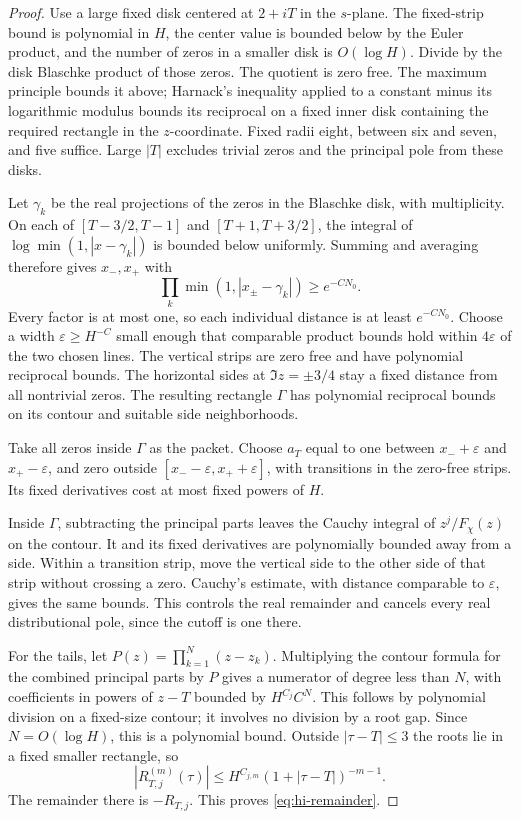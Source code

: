 \begin{proof}
Use a large fixed disk centered at $2+iT$ in the $s$-plane. The
fixed-strip bound is polynomial in $H$, the center value is bounded
below by the Euler product, and the number of zeros in a smaller disk
is $O(\log H)$. Divide by the disk Blaschke product of those zeros.
The quotient is zero free. The maximum principle bounds it above;
Harnack's inequality applied to a constant minus its logarithmic modulus
bounds its reciprocal on a fixed inner disk containing the required
rectangle in the $z$-coordinate. Fixed radii eight, between six and seven,
and five suffice. Large $|T|$ excludes trivial zeros and the principal
pole from these disks.

Let $\gamma_k$ be the real projections of the zeros in the Blaschke
disk, with multiplicity. On each of
$[T-3/2,T-1]$ and $[T+1,T+3/2]$, the integral of
$\log\min(1,|x-\gamma_k|)$ is bounded below uniformly. Summing and
averaging therefore gives $x_-,x_+$ with
\[
       \prod_k\min(1,|x_\pm-\gamma_k|)\ge e^{-CN_0}.
\]
Every factor is at most one, so each individual distance is at least
$e^{-CN_0}$. Choose a width $\varepsilon\ge H^{-C}$ small enough
that comparable product bounds hold within $4\varepsilon$ of the two
chosen lines. The vertical strips are zero free and have polynomial
reciprocal bounds. The horizontal sides at $\Im z=\pm3/4$ stay a
fixed distance from all nontrivial zeros. The resulting rectangle
$\Gamma$ has polynomial reciprocal bounds on its contour and suitable
side neighborhoods.

Take all zeros inside $\Gamma$ as the packet. Choose $a_T$ equal to
one between $x_-+\varepsilon$ and $x_+-\varepsilon$, and zero outside
$[x_--\varepsilon,x_++\varepsilon]$, with transitions in the zero-free
strips. Its fixed derivatives cost at most fixed powers of $H$.

Inside $\Gamma$, subtracting the principal parts leaves the Cauchy
integral of $z^j/F_\chi(z)$ on the contour. It and its fixed derivatives
are polynomially bounded away from a side. Within a transition strip,
move the vertical side to the other side of that strip without crossing
a zero. Cauchy's estimate, with distance comparable to $\varepsilon$,
gives the same bounds. This controls the real remainder and cancels every
real distributional pole, since the cutoff is one there.

For the tails, let $P(z)=\prod_{k=1}^N(z-z_k)$. Multiplying the contour
formula for the combined principal parts by $P$ gives a numerator of
degree less than $N$, with coefficients in powers of $z-T$ bounded by
$H^{C_j}C^N$. This follows by polynomial division on a fixed-size contour;
it involves no division by a root gap. Since $N=O(\log H)$, this is a
polynomial bound. Outside $|\tau-T|\le3$ the roots lie in a fixed
smaller rectangle, so
\[
 |R_{T,j}^{(m)}(\tau)|
       \le H^{C_{j,m}}(1+|\tau-T|)^{-m-1}.
\]
The remainder there is $-R_{T,j}$. This proves
\eqref{eq:hi-remainder}.


\end{proof}
